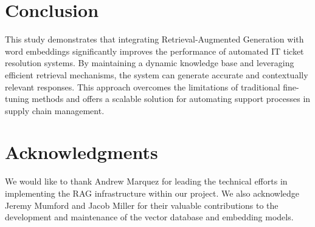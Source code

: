 \documentclass[11pt]{article}
\begin{document}
\section{Conclusion}
This study demonstrates that integrating Retrieval-Augmented Generation with word embeddings significantly improves the performance of automated IT ticket resolution systems. By maintaining a dynamic knowledge base and leveraging efficient retrieval mechanisms, the system can generate accurate and contextually relevant responses. This approach overcomes the limitations of traditional fine-tuning methods and offers a scalable solution for automating support processes in supply chain management.

\section*{Acknowledgments}
We would like to thank Andrew Marquez for leading the technical efforts in implementing the RAG infrastructure within our project. We also acknowledge Jeremy Mumford and Jacob Miller for their valuable contributions to the development and maintenance of the vector database and embedding models.
\end{document}
